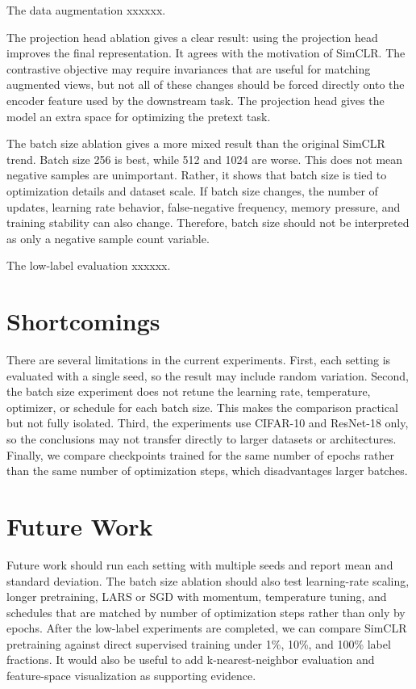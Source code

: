 \documentclass[10pt]{article}
\begin{document}
The data augmentation xxxxxx.

The projection head ablation gives a clear result: using the projection head improves the final representation. It agrees with the motivation of SimCLR. The contrastive objective may require invariances that are useful for matching augmented views, but not all of these changes should be forced directly onto the encoder feature used by the downstream task. The projection head gives the model an extra space for optimizing the pretext task.

The batch size ablation gives a more mixed result than the original SimCLR trend. Batch size 256 is best, while 512 and 1024 are worse. This does not mean negative samples are unimportant. Rather, it shows that batch size is tied to optimization details and dataset scale. If batch size changes, the number of updates, learning rate behavior, false-negative frequency, memory pressure, and training stability can also change. Therefore, batch size should not be interpreted as only a negative sample count variable.

The low-label evaluation xxxxxx.

\section{Shortcomings}

There are several limitations in the current experiments. First, each setting is evaluated with a single seed, so the result may include random variation. Second, the batch size experiment does not retune the learning rate, temperature, optimizer, or schedule for each batch size. This makes the comparison practical but not fully isolated. Third, the experiments use CIFAR-10 and ResNet-18 only, so the conclusions may not transfer directly to larger datasets or architectures. Finally, we compare checkpoints trained for the same number of epochs rather than the same number of optimization steps, which disadvantages larger batches.

\section{Future Work}

Future work should run each setting with multiple seeds and report mean and standard deviation. The batch size ablation should also test learning-rate scaling, longer pretraining, LARS or SGD with momentum, temperature tuning, and schedules that are matched by number of optimization steps rather than only by epochs. After the low-label experiments are completed, we can compare SimCLR pretraining against direct supervised training under 1\%, 10\%, and 100\% label fractions. It would also be useful to add k-nearest-neighbor evaluation and feature-space visualization as supporting evidence.
\end{document}
